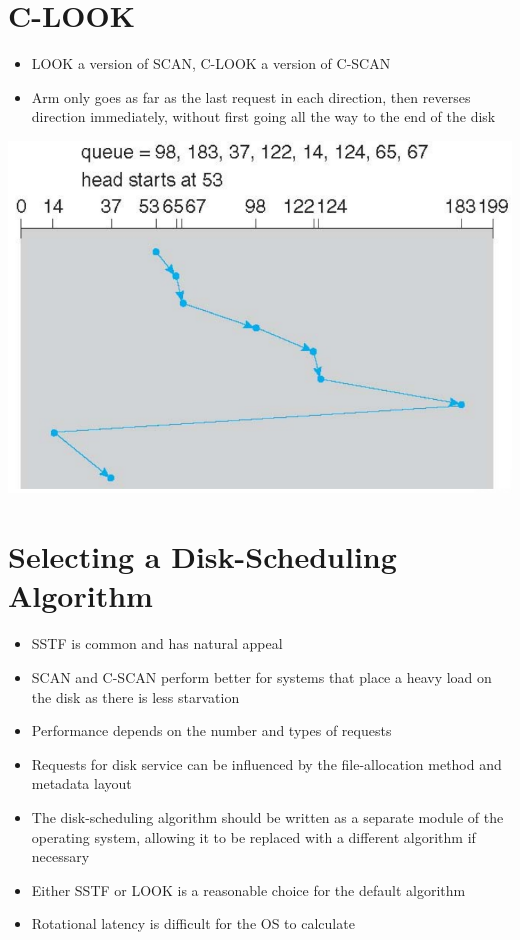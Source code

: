 \documentclass{article}[18pt]
\begin{document}
\section{C-LOOK}
\begin{itemize}
	\item LOOK a version of SCAN, C-LOOK a version of C-SCAN
	\item Arm only goes as far as the last request in each direction, then reverses direction immediately, without first going all the way to the end of the disk
\end{itemize}
\begin{center}
	\includegraphics[scale=0.7]{C-LOOK}
\end{center}
\section{Selecting a Disk-Scheduling Algorithm}
\begin{itemize}
	\item SSTF is common and has natural appeal
	\item SCAN and C-SCAN perform better for systems that place a heavy load on the disk as there is less starvation
	\item Performance depends on the number and types of requests
	\item Requests for disk service can be influenced by the file-allocation method and metadata layout
	\item The disk-scheduling algorithm should be written as a separate module of the operating system, allowing it to be replaced with a different algorithm if necessary
	\item Either SSTF or LOOK is a reasonable choice for the default algorithm
	\item Rotational latency is difficult for the OS to calculate
\end{itemize}
\end{document}
